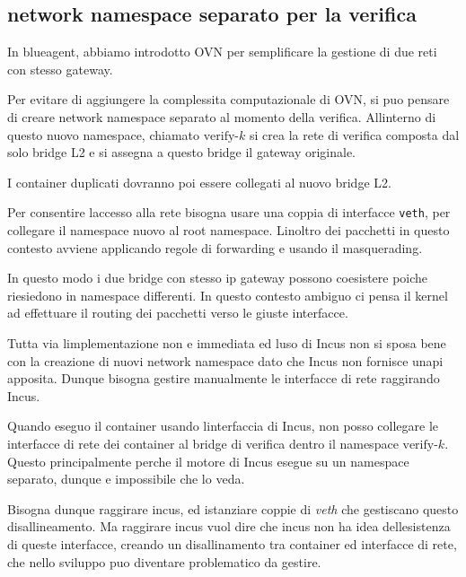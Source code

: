 \subsection{network namespace separato per la
verifica}\label{network-namespace-separato-per-la-verifica}

In blueagent, abbiamo introdotto OVN per semplificare la gestione di due
reti con stesso gateway.

Per evitare di aggiungere la complessita computazionale di OVN, si
puo\textquotesingle{} pensare di creare network namespace separato al
momento della verifica. All\textquotesingle interno di questo nuovo
namespace, chiamato \(\text{verify-}k\) si crea la rete di verifica
composta dal solo bridge L2 e si assegna a questo bridge il gateway
originale.

I container duplicati dovranno poi essere collegati al nuovo bridge L2.

Per consentire l\textquotesingle accesso alla rete bisogna usare una
coppia di interfacce \passthrough{\lstinline!veth!}, per collegare il
namespace nuovo al root namespace. L\textquotesingle inoltro dei
pacchetti in questo contesto avviene applicando regole di forwarding e
usando il masquerading.

In questo modo i due bridge con stesso ip gateway possono coesistere
poiche riesiedono in namespace differenti. In questo contesto ambiguo ci
pensa il kernel ad effettuare il routing dei pacchetti verso le giuste
interfacce.

Tutta via l\textquotesingle implementazione non e\textquotesingle{}
immediata ed l\textquotesingle uso di Incus non si sposa bene con la
creazione di nuovi network namespace dato che Incus non fornisce
un\textquotesingle api apposita. Dunque bisogna gestire manualmente le
interfacce di rete raggirando Incus.

Quando eseguo il container usando l\textquotesingle interfaccia di
Incus, non posso collegare le interfacce di rete dei container al bridge
di verifica dentro il namespace \(\text{verify-}k\). Questo
principalmente perche\textquotesingle{} il motore di Incus esegue su un
namespace separato, dunque e\textquotesingle{} impossibile che lo veda.

Bisogna dunque raggirare incus, ed istanziare coppie di \emph{veth} che
gestiscano questo disallineamento. Ma raggirare incus vuol dire che
incus non ha idea dell\textquotesingle esistenza di queste interfacce,
creando un disallinamento tra container ed interfacce di rete, che nello
sviluppo puo\textquotesingle{} diventare problematico da gestire.

